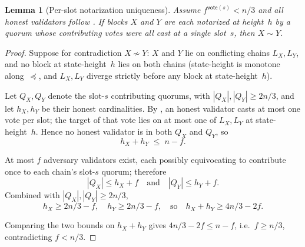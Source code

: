 \documentclass{article}
\newcommand{\vote}{\mathsf{vote}}
\theoremstyle{plain}
\newtheorem{lemma}{Lemma}
\theoremstyle{definition}
\theoremstyle{remark}
\begin{document}
\begin{lemma}[Per-slot notarization uniqueness]\label{rev:lem:notar-unique-per-slot}
Assume $f^{\vote(s)} < n/3$ and all honest validators follow . If blocks $X$ and $Y$ are each notarized at height~$h$ by a quorum whose contributing votes were all cast at a single slot~$s$, then $X \sim Y$.
\end{lemma}

\begin{proof}
Suppose for contradiction $X \not\sim Y$: $X$ and $Y$ lie on conflicting chains $L_X, L_Y$, and no block at state-height~$h$ lies on both chains (state-height is monotone along~$\preceq$, and $L_X, L_Y$ diverge strictly before any block at state-height~$h$).

Let $Q_X, Q_Y$ denote the slot-$s$ contributing quorums, with $|Q_X|, |Q_Y| \geq 2n/3$, and let $h_X, h_Y$ be their honest cardinalities.
By , an honest validator casts at most one vote per slot; the target of that vote lies on at most one of $L_X, L_Y$ at state-height~$h$. Hence no honest validator is in both $Q_X$ and $Q_Y$, so
\[
  h_X + h_Y \;\leq\; n - f.
\]

At most $f$ adversary validators exist, each possibly equivocating to contribute once to each chain's slot-$s$ quorum; therefore
\[
  |Q_X| \leq h_X + f \quad\text{and}\quad |Q_Y| \leq h_Y + f.
\]
Combined with $|Q_X|, |Q_Y| \geq 2n/3$,
\[
  h_X \geq 2n/3 - f, \quad h_Y \geq 2n/3 - f, \quad\text{so}\quad h_X + h_Y \geq 4n/3 - 2f.
\]

Comparing the two bounds on $h_X + h_Y$ gives $4n/3 - 2f \leq n - f$, i.e.\ $f \geq n/3$, contradicting $f < n/3$.
\end{proof}
\end{document}
